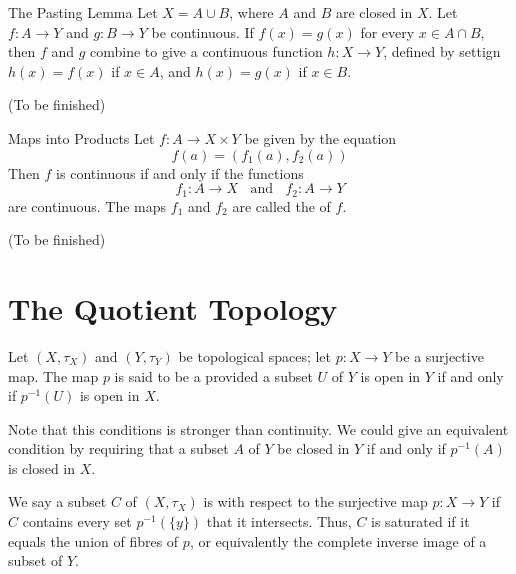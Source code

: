 \documentclass[12pt, a4paper, twoside, openright, titlepage]{book}
\begin{document}
\begin{thm}{The Pasting Lemma}{}
    Let $X = A\cup B$, where $A$ and $B$ are closed in $X$. Let $f:A\rightarrow Y$ and $g:B\rightarrow Y$ be continuous. If $f(x) = g(x)$ for every $x \in A\cap B$, then $f$ and $g$ combine to give a continuous function $h:X\rightarrow Y$, defined by settign $h(x) = f(x)$ if $x \in A$, and $h(x) = g(x)$ if $x \in B$.
\end{thm}
\begin{proof*}{}{}
    (To be finished)
\end{proof*}

\begin{thm}{Maps into Products}{}
    Let $f:A\rightarrow X\times Y$ be given by the equation \begin{equation*}
        f(a) = (f_1(a), f_2(a))
    \end{equation*}
    Then $f$ is continuous if and only if the functions \begin{equation*}
        f_1:A\rightarrow X\;\;\text{ and }\;\;f_2:A\rightarrow Y
    \end{equation*}
    are continuous. The maps $f_1$ and $f_2$ are called the  of $f$.
\end{thm}
\begin{proof*}{}{}
    (To be finished)
\end{proof*}



\section{The Quotient Topology}

\begin{defn}{}{}
    Let $(X,\tau_X)$ and $(Y,\tau_Y)$ be topological spaces; let $p:X\rightarrow Y$ be a surjective map. The map $p$ is said to be a  provided a subset $U$ of $Y$ is open in $Y$ if and only if $p^{-1}(U)$ is open in $X$.
\end{defn}

Note that this conditions is stronger than continuity. We could give an equivalent condition by requiring that a subset $A$ of $Y$ be closed in $Y$ if and only if $p^{-1}(A)$ is closed in $X$.

\begin{defn}{}{}
    We say a subset $C$ of $(X,\tau_X)$ is  with respect to the surjective map $p:X\rightarrow Y$ if $C$ contains every set $p^{-1}(\{y\})$ that it intersects. Thus, $C$ is saturated if it equals the union of fibres of $p$, or equivalently the complete inverse image of a subset of $Y$. 
\end{defn}
\end{document}
